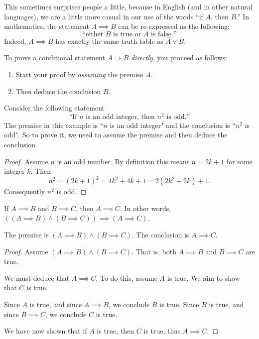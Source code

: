 \documentclass[11pt,dvipsnames]{book}
\numberwithin{figure}{section} %
\numberwithin{table}{section} %
\begin{document}
This sometimes surprises people a little, because in English (and in other natural languages), we are a little more casual in our use of the words ``if $A$, then $B$.''
In mathematics, the statement $A \implies B$ can be re-expressed as the following:
\[
    \text{``either $B$ is true or $A$ is false.''}
\]
Indeed, $A \implies B$ has exactly the same truth table as $\overline{A} \vee B$.

To prove a conditional statement $A\Longrightarrow B$ \emph{directly}, you proceed as follows:
\begin{enumerate}[label=(\alph*)]
\item Start your proof by \emph{assuming} the premise $A$.
\item Then deduce the conclusion $B$.
\end{enumerate}

\begin{example}
Consider the following statement
\[
\text{``If $n$ is an odd integer, then $n^2$ is odd.''}
\]
The premise in this example is ``$n$ is an odd integer" and the conclusion is ``$n^2$ is odd".
So to prove it, we need to assume the premise and then deduce the conclusion.
\begin{proof}
Assume $n$ is an odd number.
By definition this means $n=2k+1$ for some integer $k$.
Then
\[
n^2=(2k+1)^2=4k^2+4k+1=2(2k^2+2k)+1.
\]
Consequently $n^2$ is odd.
\end{proof}
\end{example}

\begin{example}
If $A\implies B$ and $B\implies C$, then $A\implies C$.
In other words, $((A \implies B) \wedge (B \implies C)) \implies (A \implies C)$.

The premise is $(A\implies B)\wedge(B\implies C)$.
The conclusion is $A\implies C$.
\begin{proof}
Assume $(A\implies B)\wedge(B\implies C)$.
That is, both $A \implies B$ and $B \implies C$ are true.

We must deduce that $A\implies C$.
To do this, assume $A$ is true.
We aim to show that $C$ is true.

Since $A$ is true, and since $A\implies B$, we conclude $B$ is true.
Since $B$ is true, and since $B\implies C$, we conclude $C$ is true.

We have now shown that if $A$ is true, then $C$ is true, thus $A\implies C$.
\end{proof}
\end{example}
\end{document}
